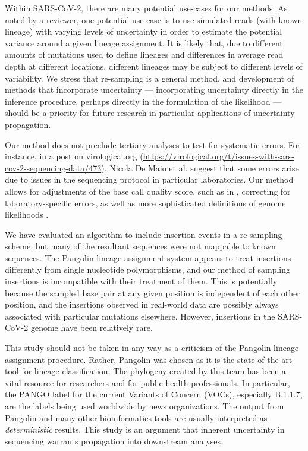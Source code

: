 \documentclass[12pt]{article}
\begin{document}
Within SARS-CoV-2, there are many potential use-cases for our methods.
As noted by a reviewer, one potential use-case is to use simulated reads (with known lineage) with varying levels of uncertainty in order to estimate the potential variance around a given lineage assignment.
It is likely that, due to different amounts of mutations used to define lineages and differences in average read depth at different locations, different lineages may be subject to different levels of variability.
We stress that re-sampling is a general method, and development of methods that incorporate uncertainty --- \eg incorporating uncertainty directly in the inference procedure, perhaps directly in the formulation of the likelihood --- should be a priority for future research in particular applications of uncertainty propagation.

Our method does not preclude tertiary analyses to test for systematic errors.
For instance, in a post on virological.org (\url{https://virological.org/t/issues-with-sars-cov-2-sequencing-data/473}), Nicola De Maio et al. suggest that some errors arise due to issues in the sequencing protocol in particular laboratories.
Our method allows for adjustments of the base call quality score, such as in \cite{brockmanQualityScoresSNP2008}, correcting for laboratory-specific errors, as well as more sophisticated definitions of genome likelihoods \cite[\eg ][]{liAdjustQualityScores2004, depristoFrameworkVariationDiscovery2011, liSNPDetectionMassively2009}.

We have evaluated an algorithm to include insertion events in a re-sampling scheme, but many of the resultant sequences were not mappable to known sequences.
The Pangolin lineage assignment system appears to treat insertions differently from single nucleotide polymorphisms, and our method of sampling insertions is incompatible with their treatment of them.
This is potentially because the sampled base pair at any given position is independent of each other position, and the insertions observed in real-world data are possibly always associated with particular mutations elsewhere.
However, insertions in the SARS-CoV-2 genome have been relatively rare.

This study should not be taken in any way as a criticism of the Pangolin lineage assignment procedure.
Rather, Pangolin was chosen as it is the state-of-the art tool for lineage classification.
The phylogeny created by this team has been a vital resource for researchers and for public health professionals.
In particular, the PANGO label for the current Variants of Concern (VOCs), especially B.1.1.7, are the labels being used worldwide by news organizations.
The output from Pangolin and many other bioinformatics tools are usually interpreted as \emph{deterministic} results.
This study is an argument that inherent uncertainty in sequencing warrants propagation into downstream analyses.
\end{document}
